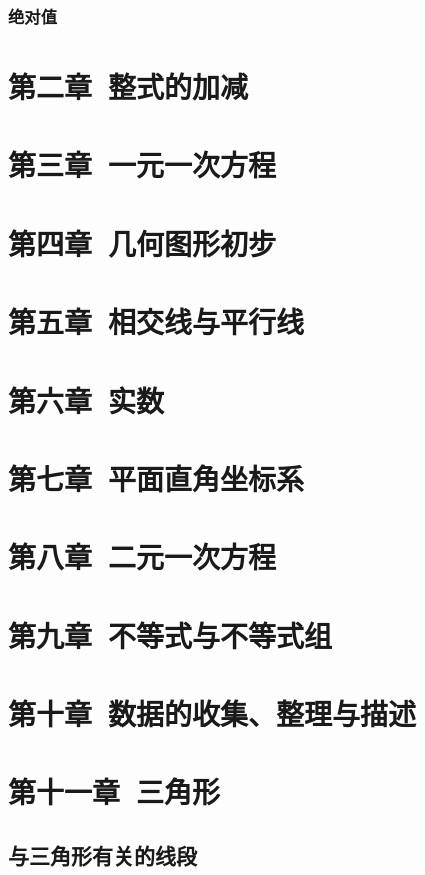 \documentclass[UTF8,fontset=macnew]{book} %
\begin{document}
			\subsection{绝对值}
	
	\chapter{第二章\ 整式的加减}
	
	\chapter{第三章\ 一元一次方程}
	
	\chapter{第四章\ 几何图形初步}
	
	\chapter{第五章\ 相交线与平行线}
	
	\chapter{第六章\ 实数}
	
	\chapter{第七章\ 平面直角坐标系}
	
	\chapter{第八章\ 二元一次方程}
	
	\chapter{第九章\ 不等式与不等式组}
	
	\chapter{第十章\ 数据的收集、整理与描述}
	
	\chapter{第十一章\ 三角形}
		\section{与三角形有关的线段}
\end{document}
